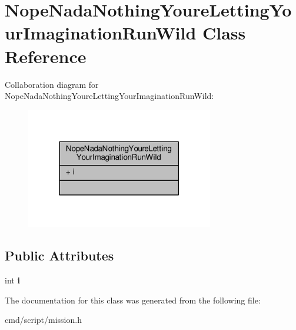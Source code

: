 \hypertarget{classNopeNadaNothingYoureLettingYourImaginationRunWild}{}\section{Nope\+Nada\+Nothing\+Youre\+Letting\+Your\+Imagination\+Run\+Wild Class Reference}
\label{classNopeNadaNothingYoureLettingYourImaginationRunWild}


Collaboration diagram for Nope\+Nada\+Nothing\+Youre\+Letting\+Your\+Imagination\+Run\+Wild\+:
\nopagebreak
\begin{figure}[H]
\begin{center}
\leavevmode
\includegraphics[width=232pt]{d3/d50/classNopeNadaNothingYoureLettingYourImaginationRunWild__coll__graph}
\end{center}
\end{figure}
\subsection*{Public Attributes}
\begin{DoxyCompactItemize}
\item 
int {\bfseries i}\hypertarget{classNopeNadaNothingYoureLettingYourImaginationRunWild_ae98143520894612fe6d1da44b67f721c}{}\label{classNopeNadaNothingYoureLettingYourImaginationRunWild_ae98143520894612fe6d1da44b67f721c}

\end{DoxyCompactItemize}


The documentation for this class was generated from the following file\+:\begin{DoxyCompactItemize}
\item 
cmd/script/mission.\+h\end{DoxyCompactItemize}
